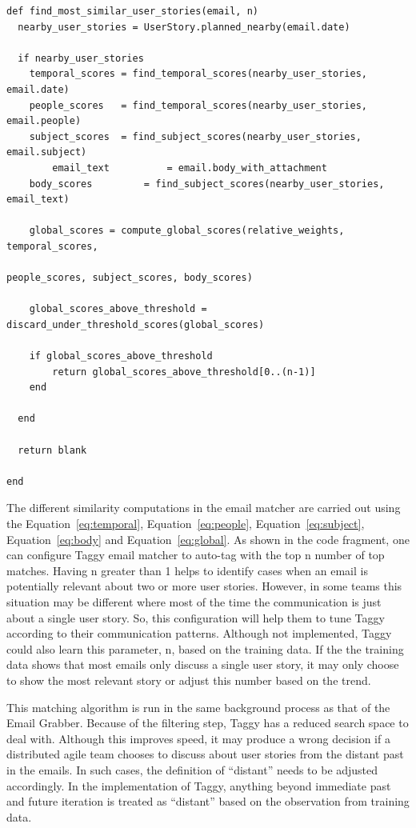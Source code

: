 \pagebreak              
\begin{verbatim}
def	find_most_similar_user_stories(email, n)
  nearby_user_stories = UserStory.planned_nearby(email.date)

  if nearby_user_stories
    temporal_scores = find_temporal_scores(nearby_user_stories, email.date)
    people_scores 	= find_temporal_scores(nearby_user_stories, email.people)
    subject_scores 	= find_subject_scores(nearby_user_stories, email.subject)
		email_text 			= email.body_with_attachment
    body_scores 		= find_subject_scores(nearby_user_stories, email_text)

    global_scores = compute_global_scores(relative_weights, temporal_scores, 
																people_scores, subject_scores, body_scores)

    global_scores_above_threshold =  discard_under_threshold_scores(global_scores)

    if global_scores_above_threshold
    	return global_scores_above_threshold[0..(n-1)]
    end
		
  end
	
  return blank
	
end
\end{verbatim}

The different similarity computations in the email matcher are carried out using the Equation~\ref{eq:temporal}, Equation~\ref{eq:people}, Equation~\ref{eq:subject}, Equation~\ref{eq:body} and Equation~\ref{eq:global}. As shown in the code fragment, one can configure Taggy email matcher to auto-tag with the top n number of top matches. Having n greater than 1 helps to identify cases when an email is potentially relevant about two or more user stories. However, in some teams this situation may be different where most of the time the communication is just about a single user story. So, this configuration will help them to tune Taggy according to their communication patterns. Although not implemented, Taggy could also learn this parameter, n, based on the training data. If the the training data shows that most emails only discuss a single user story, it may only choose to show the most relevant story or adjust this number based on the trend.

This matching algorithm is run in the same background process as that of the Email Grabber. Because of the filtering step, Taggy has a reduced search space to deal with. Although this improves speed, it may produce a wrong decision if a distributed agile team chooses to discuss about user stories from the distant past in the emails. In such cases, the definition of ``distant'' needs to be adjusted accordingly. In the implementation of Taggy, anything beyond immediate past and future iteration is treated as ``distant'' based on the observation from training data.

